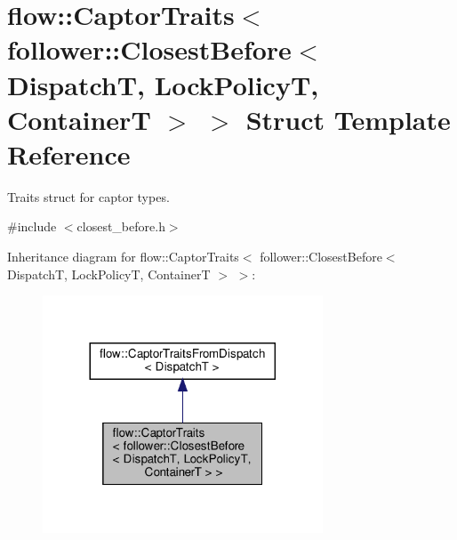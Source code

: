 \hypertarget{structflow_1_1_captor_traits_3_01follower_1_1_closest_before_3_01_dispatch_t_00_01_lock_policy_t_00_01_container_t_01_4_01_4}{}\section{flow\+:\+:Captor\+Traits$<$ follower\+:\+:Closest\+Before$<$ DispatchT, Lock\+PolicyT, ContainerT $>$ $>$ Struct Template Reference}
\label{structflow_1_1_captor_traits_3_01follower_1_1_closest_before_3_01_dispatch_t_00_01_lock_policy_t_00_01_container_t_01_4_01_4}


Traits struct for captor types.  




{\ttfamily \#include $<$closest\+\_\+before.\+h$>$}



Inheritance diagram for flow\+:\+:Captor\+Traits$<$ follower\+:\+:Closest\+Before$<$ DispatchT, Lock\+PolicyT, ContainerT $>$ $>$\+:
\nopagebreak
\begin{figure}[H]
\begin{center}
\leavevmode
\includegraphics[width=236pt]{structflow_1_1_captor_traits_3_01follower_1_1_closest_before_3_01_dispatch_t_00_01_lock_policy_t06ce7b18c724b04189c9dd980473ad88}
\end{center}
\end{figure}



